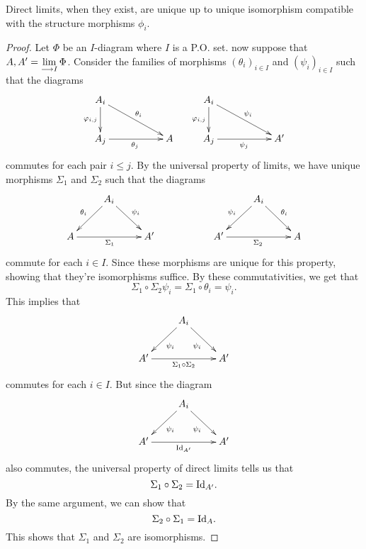 \documentclass[11pt, a4paper, twoside]{article}
\begin{document}
\begin{prop}
Direct limits, when they exist, are unique up to unique isomorphism compatible with the structure morphisms $\phi_i$.
\end{prop}
\begin{proof}
    Let $\Phi$ be an $I$-diagram where $I$ is a P.O. set. now suppose that $A,A'=\lim\limits_{\longrightarrow I}\Phi$. Consider the families of morphisms $(\theta_i)_{i\in I}$ and $(\psi_i)_{i\in I}$ such that the diagrams
    \begin{displaymath}
        \xymatrix{
            A_i\ar[d]_{\phi_{i,j}}\ar[drr]^{\theta_i}  & & & A_i\ar[d]_{\phi_{i,j}}\ar[drr]^{\psi_i}\\
            A_j\ar[rr]_{\theta_j} & & A & A_j\ar[rr]_{\psi_j} & & A'
        }
    \end{displaymath}
    commutes for each pair $i\leq j$. By the universal property of limits, we have unique morphisms $\Sigma_1$ and $\Sigma_2$ such that the diagrams
    \begin{displaymath}
        \xymatrix{
            & A_i\ar[ld]_{\theta_i}\ar[rd]^{\psi_i} & & & & A_i\ar[ld]_{\psi_i}\ar[rd]^{\theta_i} \\
            A\ar[rr]_{\Sigma_1} & & A' & & A'\ar[rr]_{\Sigma_2} & & A
        }
    \end{displaymath}
    commute for each $i\in I$. Since these morphisms are unique for this property, showing that they're isomorphisms suffice. By these commutativities, we get that $$\Sigma_1\circ\Sigma_2\psi_i=\Sigma_1\circ\theta_i=\psi_i.$$ This implies that 
    \begin{displaymath}
        \xymatrix{
            & A_i\ar[rd]_{\psi_i}\ar[ld]^{\psi_i}\\
            A'\ar[rr]_{\Sigma_1\circ\Sigma_2} & & A'
        }
    \end{displaymath}
    commutes for each $i\in I$. But since the diagram 
    \begin{displaymath}
        \xymatrix{
            & A_i\ar[rd]_{\psi_i}\ar[ld]^{\psi_i}\\
            A'\ar[rr]_{\Id_{A'}} & & A'
        }
    \end{displaymath}
    also commutes, the universal property of direct limits tells us that $$\Sigma_1\circ\Sigma_2=\mathrm{Id}_{A'}.$$ By the same argument, we can show that $$\Sigma_2\circ\Sigma_1=\mathrm{Id}_A.$$ This shows that $\Sigma_1$ and $\Sigma_2$ are isomorphisms.
\end{proof}
\end{document}
